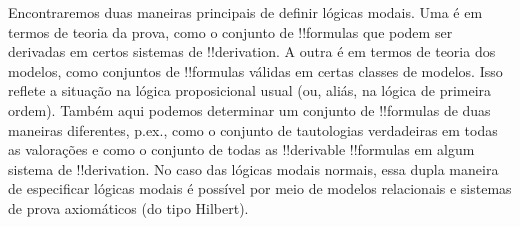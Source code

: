 \documentclass[../../../include/open-logic-section]{subfiles}
\begin{document}
Encontraremos duas maneiras principais de definir lógicas modais. Uma é
em termos de teoria da prova, como o conjunto de !!{formula}s que podem ser derivadas em
certos sistemas de !!{derivation}. A outra é em termos de teoria dos modelos, como
conjuntos de !!{formula}s válidas em certas classes de
modelos. Isso reflete a situação na lógica proposicional usual (ou, aliás, na
lógica de primeira ordem). Também aqui podemos determinar um
conjunto de !!{formula}s de duas maneiras diferentes, p.ex., como o conjunto de
tautologias verdadeiras em todas as valorações e como o
conjunto de todas as !!{derivable} !!{formula}s em algum sistema de !!{derivation}.
No caso das lógicas modais normais, essa dupla maneira de especificar lógicas modais
é possível por meio de modelos relacionais e sistemas de prova
axiomáticos (do tipo Hilbert).
\end{document}
